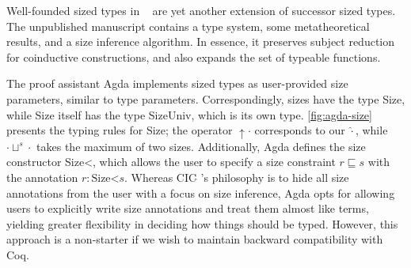 Well-founded sized types in \CIChatsub~\cite{wellfounded} are yet another extension of successor sized types.
The unpublished manuscript contains a type system, some metatheoretical results, and a size inference algorithm.
In essence, it preserves subject reduction for coinductive constructions, and also expands the set of typeable functions.



The proof assistant Agda implements sized types as user-provided size parameters, similar to type parameters.
Correspondingly, sizes have the type Size, while Size itself has the type SizeUniv, which is its own type. \autoref{fig:agda-size} presents the typing rules for Size; the operator $\uparrow \cdot$ corresponds to our $\hat{\cdot}$, while $\cdot \sqcup^s \cdot$ takes the maximum of two sizes.
Additionally, Agda defines the size constructor Size<, which allows the user to specify a size constraint $r \sqsubseteq s$ with the annotation $r: \text{Size<} s$.
Whereas CIC$\widehat{~}\,$'s philosophy is to hide all size annotations from the user with a focus on size inference, Agda opts for allowing users to explicitly write size annotations and treat them almost like terms, yielding greater flexibility in deciding how things should be typed.
However, this approach is a non-starter if we wish to maintain backward compatibility with Coq.
